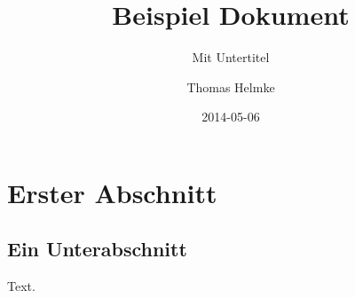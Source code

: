 \documentclass{scrartcl}
\title{Beispiel Dokument}
\subtitle{Mit Untertitel}
\author{Thomas Helmke}
\date{2014-05-06}
\begin{document}
\maketitle
\section{Erster Abschnitt}
\subsection{Ein Unterabschnitt}
Text.
\end{document}
